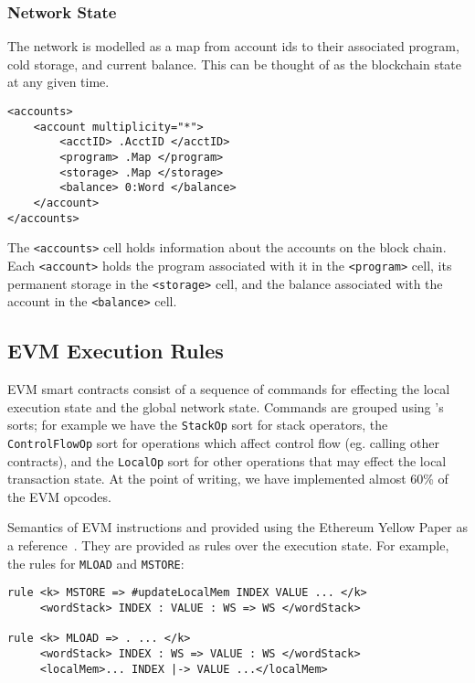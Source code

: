 \subsubsection{Network State}

The network is modelled as a map from account ids to their associated program,
cold storage, and current balance. This can be thought of as the blockchain
state at any given time.

\begin{verbatim}
<accounts>
    <account multiplicity="*">
        <acctID> .AcctID </acctID>
        <program> .Map </program>
        <storage> .Map </storage>
        <balance> 0:Word </balance>
    </account>
</accounts>
\end{verbatim}

The \texttt{<accounts>} cell holds information about the accounts on the block
chain. Each \texttt{<account>} holds the program associated with it in the
\texttt{<program>} cell, its permanent storage in the \texttt{<storage>} cell,
and the balance associated with the account in the \texttt{<balance>} cell.

\subsection{EVM Execution Rules}

EVM smart contracts consist of a sequence of commands for effecting the local
execution state and the global network state. Commands are grouped using \K's
sorts; for example we have the \texttt{StackOp} sort for stack operators, the
\texttt{ControlFlowOp} sort for operations which affect control flow (eg.
calling other contracts), and the \texttt{LocalOp} sort for other operations
that may effect the local transaction state. At the point of writing, we have
implemented almost 60\% of the EVM opcodes.

Semantics of EVM instructions and provided using the Ethereum Yellow Paper as a
reference~\cite{gavwood}. They are provided as \K rules over the execution
state. For example, the rules for \texttt{MLOAD} and \texttt{MSTORE}:

\begin{verbatim}
rule <k> MSTORE => #updateLocalMem INDEX VALUE ... </k>
     <wordStack> INDEX : VALUE : WS => WS </wordStack>

rule <k> MLOAD => . ... </k>
     <wordStack> INDEX : WS => VALUE : WS </wordStack>
     <localMem>... INDEX |-> VALUE ...</localMem>
\end{verbatim}

